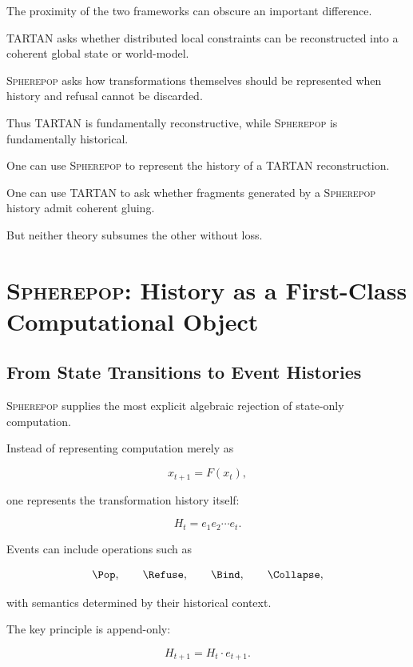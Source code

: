 \documentclass[11pt]{article}
\theoremstyle{remark}
\newcommand{\TARTAN}{\textsc{TARTAN}}
\newcommand{\Spherepop}{\textsc{Spherepop}}
\begin{document}
The proximity of the two frameworks can obscure an important difference.

\TARTAN{} asks whether distributed local constraints can be reconstructed into a coherent global state or world-model.

\Spherepop{} asks how transformations themselves should be represented when history and refusal cannot be discarded.

Thus \TARTAN{} is fundamentally reconstructive, while \Spherepop{} is fundamentally historical.

One can use \Spherepop{} to represent the history of a \TARTAN{} reconstruction.

One can use \TARTAN{} to ask whether fragments generated by a \Spherepop{} history admit coherent gluing.

But neither theory subsumes the other without loss.

\section{\Spherepop{}: History as a First-Class Computational Object}

\subsection{From State Transitions to Event Histories}

\Spherepop{} supplies the most explicit algebraic rejection of state-only computation.

Instead of representing computation merely as

\begin{equation}
x_{t+1}=F(x_t),
\end{equation}

one represents the transformation history itself:

\begin{equation}
H_t
=
e_1e_2\cdots e_t.
\end{equation}

Events can include operations such as

\begin{equation}
\Pop,\qquad
\Refuse,\qquad
\Bind,\qquad
\Collapse,
\end{equation}

with semantics determined by their historical context.

The key principle is append-only:

\begin{equation}
H_{t+1}
=
H_t\cdot e_{t+1}.
\end{equation}
\end{document}
